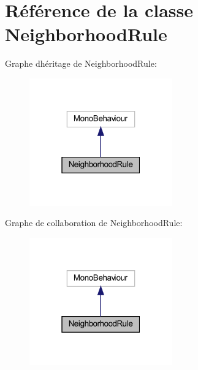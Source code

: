 \hypertarget{class_neighborhood_rule}{}\section{Référence de la classe Neighborhood\+Rule}
\label{class_neighborhood_rule}


Graphe d\textquotesingle{}héritage de Neighborhood\+Rule\+:\nopagebreak
\begin{figure}[H]
\begin{center}
\leavevmode
\includegraphics[width=175pt]{class_neighborhood_rule__inherit__graph}
\end{center}
\end{figure}


Graphe de collaboration de Neighborhood\+Rule\+:\nopagebreak
\begin{figure}[H]
\begin{center}
\leavevmode
\includegraphics[width=175pt]{class_neighborhood_rule__coll__graph}
\end{center}
\end{figure}
